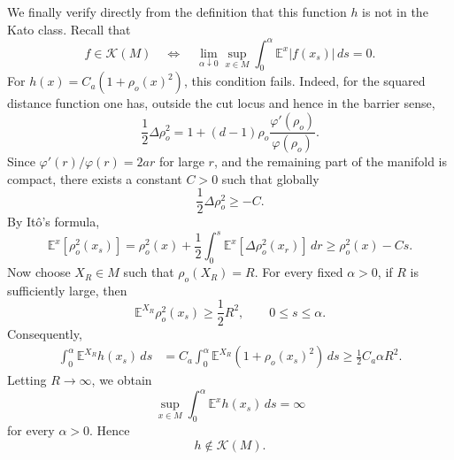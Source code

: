 \documentclass[11pt,twoside, reqno]{article}
\def\r{\right}
\def\l{\left}
\newcommand\1{\mathbbm{1}}
\theoremstyle{definition}
\numberwithin{equation}{section}
\begin{document}
We finally verify directly from the definition that this function \(h\) is not
in the Kato class. Recall that
\[
        f\in\mathcal K(M)
        \quad\Longleftrightarrow\quad
        \lim_{\alpha\downarrow0}
        \sup_{x\in M}
        \int_0^\alpha
        \mathbb E^x |f(x_s)|\,ds
        =
        0.
\]
For \(h(x)=C_a(1+\rho_o(x)^2)\), this condition fails. Indeed, for the squared
distance function one has, outside the cut locus and hence in the barrier
sense,
\[
        \frac12\Delta \rho_o^2
        =
        1+(d-1)\rho_o\frac{\varphi'(\rho_o)}{\varphi(\rho_o)}.
\]
Since \(\varphi'(r)/\varphi(r)=2ar\) for large \(r\), and the remaining part of
the manifold is compact, there exists a constant \(C>0\) such that globally
\[
        \frac12\Delta \rho_o^2\geq -C.
\]
By It\^o's formula,
\[
        \mathbb E^x \l[ \rho_o^2(x_s)\r]
        =
        \rho_o^2(x)+
       \frac12 \int_0^s
       \mathbb E^x\l[ \Delta  \rho_o^2(x_r)\r] \,dr
        \geq
        \rho_o^2(x)-Cs.
\]
Now choose \(X_R\in M\) such that \(\rho_o(X_R)=R\). For every fixed
\(\alpha>0\), if \(R\) is sufficiently large, then
\[
        \mathbb E^{X_R}\rho_o^2(x_s)
        \geq
        \frac12 R^2,
        \qquad 0\leq s\leq \alpha.
\]
Consequently,
\[
\begin{aligned}
\int_0^\alpha
\mathbb E^{X_R} h(x_s)\,ds
&=
C_a\int_0^\alpha
\mathbb E^{X_R}
\left(1+\rho_o(x_s)^2\right)\,ds  \geq
\frac12 C_a\alpha R^2.
\end{aligned}
\]
Letting \(R\to\infty\), we obtain
\[
        \sup_{x\in M}
        \int_0^\alpha
        \mathbb E^x h(x_s)\,ds
        =
        \infty
\]
for every \(\alpha>0\). Hence
\[
        h\notin\mathcal K(M).
\]
\end{document}
